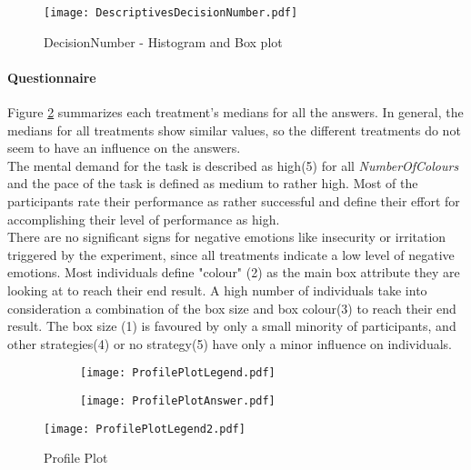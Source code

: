 \begin{figure}[htbp] %
\begin{center} 
\texttt{[image: DescriptivesDecisionNumber.pdf]}
  \caption{DecisionNumber - Histogram and Box plot}
    \label{DistributionDecisionNumber} 
\end{center}
\end{figure}

\paragraph{Questionnaire}
\label{ch:Evaluation:sec:DescriptiveStatistics:subsec:Questionnaire}

Figure \ref{ProfilePlot} summarizes each treatment's medians for all the answers. In general, the medians for all treatments show similar values, so the different treatments do not seem to have an influence on the answers.\\
The mental demand for the task is described as high(5) for all \textit{NumberOfColours} and the pace of the task is defined as medium to rather high. 
Most of the participants rate their performance as rather successful and define their effort for accomplishing their level of performance as high.\\  
There are no significant signs for negative emotions like insecurity or irritation triggered by the experiment, since all treatments indicate a low level of negative emotions. 
Most individuals define "colour" (2) as the main box attribute they are looking at to reach their end result. A high number of individuals take into consideration a combination of the box size and box colour(3) to reach their end result.
The box size (1) is favoured by only a small minority of participants, and other strategies(4) or no strategy(5) have only a minor influence on individuals.
 \begin{figure}[t] %
\begin{center} %
\begin{subfigure} 
\centering
 \texttt{[image: ProfilePlotLegend.pdf]}
\end{subfigure} 
\begin{subfigure}
\centering
 \texttt{[image: ProfilePlotAnswer.pdf]}
\end{subfigure}
\begin{subfigure} 
 \raggedright
 \texttt{[image: ProfilePlotLegend2.pdf]}
\end{subfigure}    
  \caption{Profile Plot}
  \label{ProfilePlot}
\end{center}
\end{figure}

